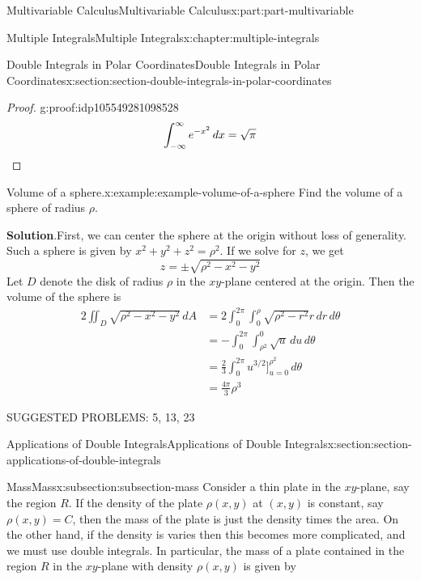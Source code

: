 \documentclass[twoside,10pt,]{book}
\newcommand{\blocktitlefont}{\relax}
\numberwithin{equation}{part}
\newcommand{\qedhere}{\relax}
\begin{document}
\begin{partptx}{Multivariable Calculus}{}{Multivariable Calculus}{}{}{x:part:part-multivariable}
\begin{chapterptx}{Multiple Integrals}{}{Multiple Integrals}{}{}{x:chapter:multiple-integrals}
\begin{sectionptx}{Double Integrals in Polar Coordinates}{}{Double Integrals in Polar Coordinates}{}{}{x:section:section-double-integrals-in-polar-coordinates}
\begin{proof}{}{g:proof:idp105549281098528}
\begin{equation*}
\int_{-\infty}^{\infty}e^{-x^{2}}\,dx = \sqrt{\pi}\qedhere
\end{equation*}
%
\end{proof}
\begin{example}{Volume of a sphere.}{x:example:example-volume-of-a-sphere}%
Find the volume of a sphere of radius \(\rho\).%
\par\smallskip%
\noindent\textbf{\blocktitlefont Solution}.\hypertarget{g:solution:idp105549281103520}{}\quad{}First, we can center the sphere at the origin without loss of generality. Such a sphere is given by \(x^{2} + y^{2} + z^{2} = \rho^{2}\). If we solve for \(z\), we get%
\begin{equation*}
z = \pm\sqrt{\rho^{2} - x^{2} - y^{2}}
\end{equation*}
Let \(D\) denote the disk of radius \(\rho\) in the \(xy\)-plane centered at the origin. Then the volume of the sphere is%
\begin{align*}
2\iint_{D}\sqrt{\rho^{2} - x^{2} - y^{2}}\,dA & = 2\int_{0}^{2\pi}\int_{0}^{\rho}\sqrt{\rho^{2} - r^{2}}r\,dr\,d\theta \\
& = -\int_{0}^{2\pi}\int_{\rho^{2}}^{0}\sqrt{u}\,du\,d\theta \\
& = \frac{2}{3}\int_{0}^{2\pi}u^{3/2}\bigg]_{u=0}^{\rho^{2}}\,d\theta \\
& = \frac{4\pi}{3}\rho^{3} 
\end{align*}
%
\end{example}
SUGGESTED PROBLEMS: 5, 13, 23%
\end{sectionptx}
%
%
\typeout{************************************************}
\typeout{************************************************}
%
\begin{sectionptx}{Applications of Double Integrals}{}{Applications of Double Integrals}{}{}{x:section:section-applications-of-double-integrals}
%
%
\typeout{************************************************}
\typeout{************************************************}
%
\begin{subsectionptx}{Mass}{}{Mass}{}{}{x:subsection:subsection-mass}
Consider a thin plate in the \(xy\)-plane, say the region \(R\). If the density of the plate \(\rho(x,y)\) at \((x,y)\) is constant, say \(\rho(x,y) = C\), then the mass of the plate is just the density times the area. On the other hand, if the density is varies then this becomes more complicated, and we must use double integrals. In particular, the mass of a plate contained in the region \(R\) in the \(xy\)-plane with density \(\rho(x,y)\) is given by%

\end{subsectionptx}
\end{sectionptx}
\end{chapterptx}
\end{partptx}
\end{document}
